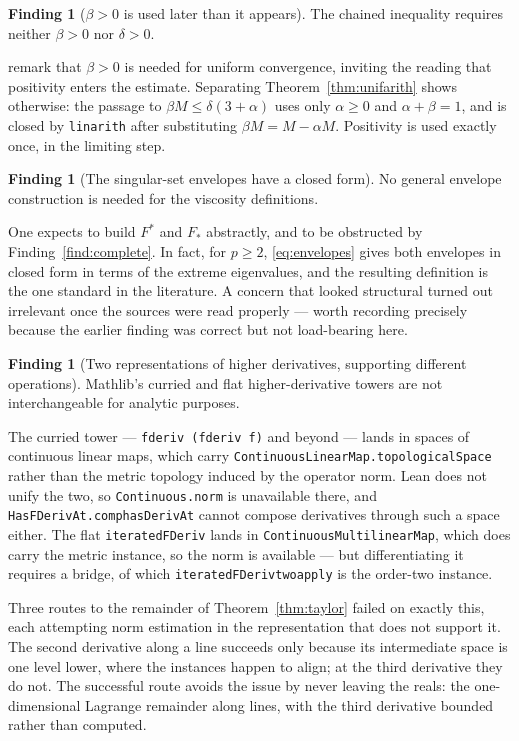 \documentclass[11pt,reqno]{amsart}
\newcommand{\LEANREF}[1]{\texttt{\small\def\_{\textunderscore\allowbreak}#1}}
\theoremstyle{plain}
\theoremstyle{definition}
\newtheorem{finding}[theorem]{Finding}
\begin{document}
\begin{finding}[$\beta > 0$ is used later than it appears]\label{find:beta}
The chained inequality requires neither $\beta>0$ nor $\delta>0$.
\end{finding}

\cite{LPS14} remark that $\beta>0$ is needed for uniform convergence, inviting
the reading that positivity enters the estimate. Separating
Theorem~\ref{thm:unifarith} shows otherwise: the passage to
$\beta M \le \delta(3+\alpha)$ uses only $\alpha \ge 0$ and $\alpha+\beta=1$,
and is closed by \texttt{linarith} after substituting
$\beta M = M - \alpha M$. Positivity is used exactly once, in the limiting
step.

\begin{finding}[The singular-set envelopes have a closed
form]\label{find:envelope}
No general envelope construction is needed for the viscosity definitions.
\end{finding}

One expects to build $F^*$ and $F_*$ abstractly, and to be obstructed by
Finding~\ref{find:complete}. In fact, for $p \ge 2$, \eqref{eq:envelopes} gives
both envelopes in closed form in terms of the extreme eigenvalues, and the
resulting definition is the one standard in the literature. A concern that
looked structural turned out irrelevant once the sources were read properly ---
worth recording precisely because the earlier finding was correct but not
load-bearing here.


\begin{finding}[Two representations of higher derivatives, supporting
different operations]\label{find:reps}
Mathlib's curried and flat higher-derivative towers are not interchangeable
for analytic purposes.
\end{finding}

The curried tower --- \LEANREF{fderiv (fderiv f)} and beyond --- lands in
spaces of continuous linear maps, which carry
\LEANREF{ContinuousLinearMap.topologicalSpace} rather than the metric topology
induced by the operator norm. Lean does not unify the two, so
\LEANREF{Continuous.norm} is unavailable there, and
\LEANREF{HasFDerivAt.comp\_hasDerivAt} cannot compose derivatives through such
a space either. The flat \LEANREF{iteratedFDeriv} lands in
\LEANREF{ContinuousMultilinearMap}, which does carry the metric instance, so
the norm is available --- but differentiating it requires a bridge, of which
\LEANREF{iteratedFDeriv\_two\_apply} is the order-two instance.

Three routes to the remainder of Theorem~\ref{thm:taylor} failed on exactly
this, each attempting norm estimation in the representation that does not
support it. The second derivative along a line succeeds only because its
intermediate space is one level lower, where the instances happen to align; at
the third derivative they do not. The successful route avoids the issue by
never leaving the reals: the one-dimensional Lagrange remainder along lines,
with the third derivative bounded rather than computed.
\end{document}
